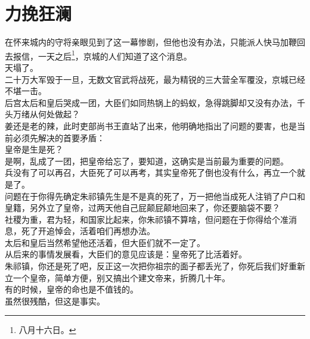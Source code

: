 \section{力挽狂澜}
\ifnum{}
	\begin{multicols}{\theparacolNo}
\fi
在怀来城内的守将亲眼见到了这一幕惨剧，但他也没有办法，只能派人快马加鞭回去报信，一天之后\footnote{八月十六日。}，京城的人们知道了这个消息。\\

天塌了。\\

二十万大军毁于一旦，无数文官武将战死，最为精锐的三大营全军覆没，京城已经不堪一击。\\

后宫太后和皇后哭成一团，大臣们如同热锅上的蚂蚁，急得跳脚却又没有办法，千头万绪从何处做起？\\

姜还是老的辣，此时吏部尚书王直站了出来，他明确地指出了问题的要害，也是当前必须先解决的首要矛盾：\\

皇帝是生是死？\\

是啊，乱成了一团，把皇帝给忘了，要知道，这确实是当前最为重要的问题。\\

兵没有了可以再召，大臣死了可以再考，其实皇帝死了倒也没有什么，再立一个就是了。\\

问题在于你得先确定朱祁镇先生是不是真的死了，万一把他当成死人注销了户口和皇籍，另外立了皇帝，过两天他自己屁颠屁颠地回来了，你还要脑袋不要？\\

社稷为重，君为轻，和国家比起来，你朱祁镇不算啥，但问题在于你得给个准消息，死了开追悼会，活着咱们再想办法。\\

太后和皇后当然希望他还活着，但大臣们就不一定了。\\

从后来的事情发展看，大臣们的意见应该是：皇帝死了比活着好。\\

朱祁镇，你还是死了吧，反正这一次把你祖宗的面子都丢光了，你死后我们好重新立一个皇帝，简单方便，别又搞出个建文帝来，折腾几十年。\\

有的时候，皇帝的命也是不值钱的。\\

虽然很残酷，但这是事实。\\


\end{multicols}
